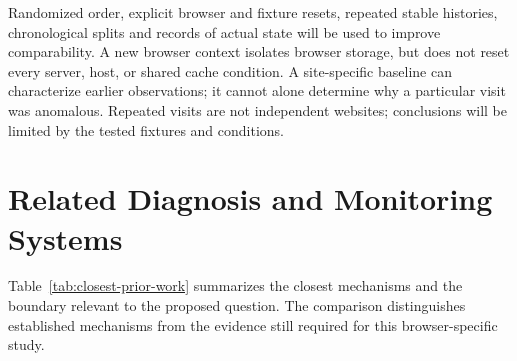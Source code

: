 Randomized order, explicit browser and fixture resets, repeated stable histories, chronological splits and records of actual state will be used to improve comparability. A new browser context isolates browser storage, but does not reset every server, host, or shared cache condition. A site-specific baseline can characterize earlier observations; it cannot alone determine why a particular visit was anomalous. Repeated visits are not independent websites; conclusions will be limited by the tested fixtures and conditions.

\section{Related Diagnosis and Monitoring Systems}

Table~\ref{tab:closest-prior-work} summarizes the closest mechanisms and the boundary relevant to the proposed question. The comparison distinguishes established mechanisms from the evidence still required for this browser-specific study.

